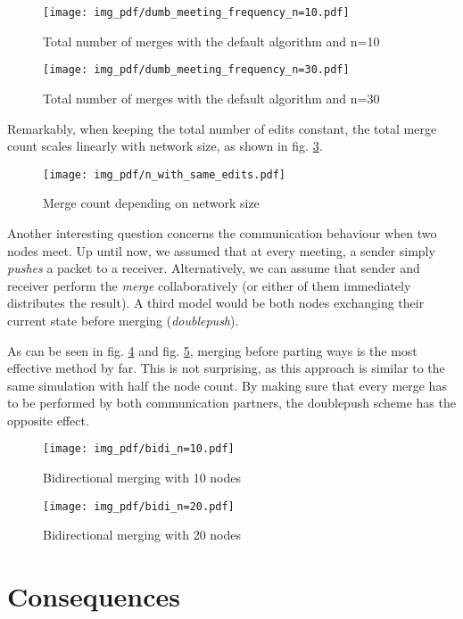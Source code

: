 \documentclass[conference,a4paper]{IEEEtran}
\begin{document}
\begin{figure}
  \texttt{[image: img\_pdf/dumb\_meeting\_frequency\_n=10.pdf]}
  \caption{Total number of merges with the default algorithm and n=10}
  \label{fig:freq_dumb_n10}
\end{figure}
\begin{figure}
  \texttt{[image: img\_pdf/dumb\_meeting\_frequency\_n=30.pdf]}
  \caption{Total number of merges with the default algorithm and n=30}
  \label{fig:freq_dumb_n30}
\end{figure}

Remarkably, when keeping the total number of edits constant, the total merge count scales linearly with network size, as shown in fig. \ref{fig:n}.

\begin{figure}
  \texttt{[image: img\_pdf/n\_with\_same\_edits.pdf]}
  \caption{Merge count depending on network size}
  \label{fig:n}
\end{figure}



Another interesting question concerns the communication behaviour when two nodes meet. Up until now, we assumed that at every meeting, a sender simply \textit{pushes} a packet to a receiver. Alternatively, we can assume that sender and receiver perform the \textit{merge} collaboratively (or either of them immediately distributes the result). A third model would be both nodes exchanging their current state before merging (\textit{doublepush}).

As can be seen in fig. \ref{fig:bidi_n10} and fig. \ref{fig:bidi_n20}, merging before parting ways is the most effective method by far. This is not surprising, as this approach is similar to the same simulation with half the node count. By making sure that every merge has to be performed by both communication partners, the doublepush scheme has the opposite effect.

\begin{figure}
  \texttt{[image: img\_pdf/bidi\_n=10.pdf]}
  \caption{Bidirectional merging with 10 nodes}
  \label{fig:bidi_n10}
\end{figure}
\begin{figure}
  \texttt{[image: img\_pdf/bidi\_n=20.pdf]}
  \caption{Bidirectional merging with 20 nodes}
  \label{fig:bidi_n20}
\end{figure}

\section{Consequences}
\end{document}
